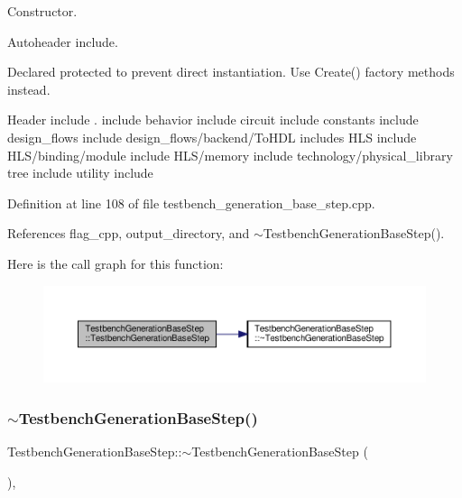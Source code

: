 Constructor. 

Autoheader include.

Declared protected to prevent direct instantiation. Use Create() factory methods instead.

Header include . include behavior include circuit include constants include design\+\_\+flows include design\+\_\+flows/backend/\+To\+H\+DL includes H\+LS include H\+L\+S/binding/module include H\+L\+S/memory include technology/physical\+\_\+library tree include utility include 

Definition at line 108 of file testbench\+\_\+generation\+\_\+base\+\_\+step.\+cpp.



References flag\+\_\+cpp, output\+\_\+directory, and $\sim$\+Testbench\+Generation\+Base\+Step().

Here is the call graph for this function\+:
\nopagebreak
\begin{figure}[H]
\begin{center}
\leavevmode
\includegraphics[width=350pt]{dc/d02/classTestbenchGenerationBaseStep_ab6735269f9e989952695c74d9d982ff6_cgraph}
\end{center}
\end{figure}
\mbox{\label{classTestbenchGenerationBaseStep_a474ad98fb32935847aa4050e3aa8f979}} 
\subsubsection{\texorpdfstring{$\sim$\+Testbench\+Generation\+Base\+Step()}{~TestbenchGenerationBaseStep()}}
{\footnotesize\ttfamily Testbench\+Generation\+Base\+Step\+::$\sim$\+Testbench\+Generation\+Base\+Step (\begin{DoxyParamCaption}{ }\end{DoxyParamCaption})\hspace{0.3cm}{\ttfamily [override]}, {\ttfamily [default]}}



